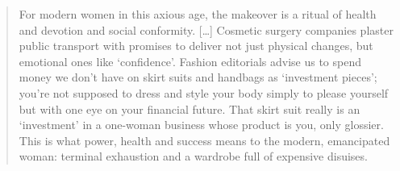 \begin{quote}
For modern women in this axious age, the makeover is a ritual of health and devotion and social conformity.
[\ldots]
Cosmetic surgery companies plaster public transport with promises to deliver not just physical changes, but emotional ones like `confidence'.
Fashion editorials advise us to spend money we don't have on skirt suits and handbags as `investment pieces'; you're not supposed to dress and style your body simply to please yourself but with one eye on your financial future.
That skirt suit really is an `investment' in a one-woman business whose product is you, only glossier.
This is what power, health and success means to the modern, emancipated woman: terminal exhaustion and a wardrobe full of expensive disuises.~\cite[p.41-42]{Penny14}
\end{quote}

